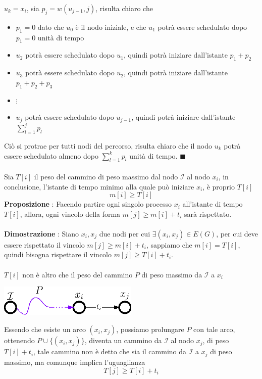 \documentclass[12pt, letterpaper]{article}
\newcommand{\acc}{\\\hphantom{}\\}
\begin{document}
$u_k=x_i$, sia $p_j = w(u_{j-1},j)$, risulta chiaro che\begin{itemize}
    \item $p_1=0$ dato che $u_0$ è il nodo iniziale, e che $u_1$ potrà essere schedulato dopo $p_1=0$ unità di tempo 
    \item $u_2$ potrà essere schedulato dopo $u_1$, quindi potrà iniziare dall'istante $p_1+p_2$
    \item $u_3$ potrà essere schedulato dopo $u_2$, quindi potrà iniziare dall'istante $p_1+p_2+p_3$
    \item $\vdots$ 
    \item $u_j$ potrà essere schedulato dopo $u_{j-1}$, quindi potrà iniziare dall'istante $\displaystyle\sum_{l=1}^j p_l$
\end{itemize}
Ciò si protrae per tutti nodi del percorso, risulta chiaro che il nodo $u_k$ potrà essere schedulato almeno dopo 
$\sum_{l=1}^k p_l$ unità di tempo. $\blacksquare$\acc
Sia $T[i]$ il peso del cammino di peso massimo dal nodo $\mathcal{I}$ al nodo $x_i$, in conclusione, l'istante di tempo 
minimo alla quale può iniziare $x_i$, è proprio $T[i]$ $$ m[i]\ge T[i]$$
\textbf{Proposizione} :  Facendo partire ogni singolo processo 
$x_i$ all'istante di tempo $T[i]$, allora, ogni vincolo della forma $m[j]\ge m[i]+t_i$ sarà rispettato.\acc 
\textbf{Dimostrazione} : Siano $x_i,x_j$ due nodi per cui $\exists(x_i,x_j)\in E(G)$, per cui deve essere rispettato 
il vincolo $m[j]\ge m[i]+t_i$, sappiamo che $m[i]=T[i]$, quindi bisogna rispettare il vincolo 
$m[j]\ge T[i]+t_i$.\acc 
$T[i]$ non è altro che il peso del cammino $P$ di peso massimo da $\mathcal{I}$ a $x_i$\begin{center}
    \includegraphics[width=0.5\textwidth ]{images/dimScheduling.eps}
\end{center}
Essendo che esiste un arco $(x_i,x_j)$, possiamo prolungare $P$ con tale arco, ottenendo $P\cup \{(x_i,x_j)\}$, diventa un 
cammino da $\mathcal{I}$ al nodo $x_j$, di peso $T[i]+t_i$, tale cammino non è detto che sia il cammino da 
$\mathcal{I}$ a $x_j$ di peso massimo, ma comunque implica l'uguaglianza $$ T[j]\ge T[i]+t_i$$
\end{document}
